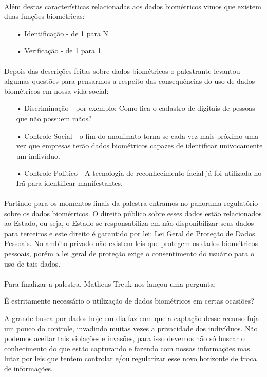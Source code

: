 \documentclass[12pt]{article}
\begin{document}
	\paragraph{}
		Além destas características relacionadas aos dados biométricos vimos que 
		existem duas funções biométricas:
		\begin{itemize}
			\item[•]
				Identificação - de 1 para N
			\item[•]
				Verificação - de 1 para 1	
		\end{itemize}
	\paragraph{}
		Depois das descrições feitas sobre dados biométricos o palestrante levantou
		algumas questões para pensarmos a respeito das consequências do uso
		de dados biométricos em nossa vida social:
		\begin{itemize}
			\item[•]
				Discriminação - por exemplo: Como fica o cadastro de digitais de
				pessoas que não possuem mãos?
			\item[•]
				Controle Social - o fim do anonimato torna-se cada vez mais próximo
				uma vez que empresas terão dados biométricos capazes de identificar
				univocamente um indivíduo.	 
			\item[•]
				Controle Político - A tecnologia de reconhecimento facial já foi 
				utilizada no Irã para identificar manifestantes.	
		\end{itemize}
	\paragraph{}
		Partindo para os momentos finais da palestra entramos no panorama regulatório
		sobre os dados biométricos. O direito público sobre esses dados estão
		relacionados ao Estado, ou seja, o Estado se responsabiliza em não
		disponibilizar seus dados para terceiros e este direito é garantido
		por lei: Lei Geral de Proteção de Dados Pessoais.
		No ambito privado não existem leis que protegem os dados biométricos
		pessoais, porém a lei geral de proteção exige o consentimento do usuário
		para o uso de tais dados.
	\paragraph{}
		Para finalizar a palestra, Matheus Treuk nos lançou uma pergunta:
		\begin{center}		
			É estritamente necessário o utilização de dados biométricos em certas
			ocasiões?
		\end{center}
		A grande busca por dados hoje em dia faz com que a captação desse recurso
		fuja um pouco do controle, invadindo muitas vezes a privacidade dos
		indivíduos. Não podemos aceitar tais violações e invasões, para isso
		devemos não só buscar o conhecimento do que estão capturando e fazendo
		com nossas informações mas lutar por leis que tentem controlar e/ou 
		regularizar esse novo horizonte de troca de informações.		
\end{document}
